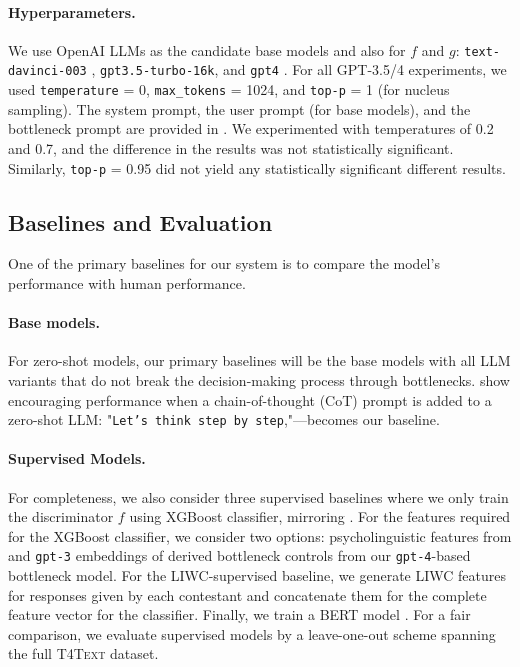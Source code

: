 \paragraph{Hyperparameters.} We use OpenAI LLMs as the candidate base models and also for $f$ and $g$: \texttt{text-davinci-003} \cite{Brown2020LanguageMA}, \texttt{gpt3.5-turbo-16k}, and \texttt{gpt4} \cite{OpenAI2023GPT4TR}. For all GPT-3.5/4 experiments, we used \texttt{temperature} = 0, \texttt{max\_tokens} = 1024, and \texttt{top-p} = 1 (for nucleus sampling). The system prompt, the user prompt (for base models), and the bottleneck prompt are provided in . We experimented with temperatures of 0.2 and 0.7, and the difference in the results was not statistically significant. Similarly, \texttt{top-p} = 0.95 did not yield any statistically significant different results. 

\subsection{Baselines and Evaluation}
One of the primary baselines for our system is to compare the model's performance with human performance. 

\paragraph{Base models.} For zero-shot models, our primary baselines will be the base models with all LLM variants that do not break the decision-making process through bottlenecks. \citet{Kojima2022LargeLM} show encouraging performance when a chain-of-thought (CoT) prompt is added to a zero-shot LLM: "\texttt{Let's think step by step},"---becomes our baseline.

\paragraph{Supervised Models.} For completeness, we also consider three supervised baselines where we only train the discriminator $f$ using XGBoost classifier, mirroring \cite{soldner2019box}. For the features required for the XGBoost classifier, we consider two options: psycholinguistic features from \citet{soldner2019box} and \texttt{gpt-3} embeddings of derived bottleneck controls from our \texttt{gpt-4}-based bottleneck model. For the LIWC-supervised baseline, we generate LIWC features for responses given by each contestant and concatenate them for the complete feature vector for the classifier. Finally, we train a BERT model \cite{DBLP:conf/naacl/DevlinCLT19}. For a fair comparison, we evaluate supervised models by a leave-one-out scheme spanning the full \textsc{T4Text} dataset.

